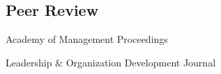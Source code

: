 \documentclass[11pt,letterpaper]{report} %
\newcommand{\listitemspace}{0.25em}
\renewenvironment{itemize}
{\begin{list}{}{\setlength{\leftmargin}{0em}
                \setlength{\parskip}{0em}
                \setlength{\itemsep}{\listitemspace}
                \setlength{\parsep}{\listitemspace}}}
{\end{list}}
\begin{document}












    \subsection*{Peer Review}

    \begin{itemize}

        \item Academy of Management Proceedings

        \item Leadership \& Organization Development Journal

    \end{itemize}
\end{document}
